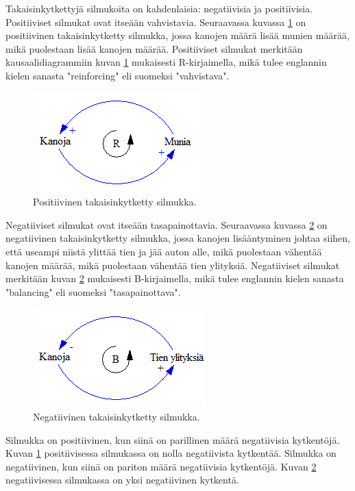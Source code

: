 \documentclass[finnish,12pt,a4paper,pdftex]{article}
\begin{document}
\begin{onehalfspacing}
Takaisinkytkettyjä silmukoita on kahdenlaisia: negatiivisia ja positiivisia. Positiiviset silmukat ovat itseään vahvistavia. Seuraavassa kuvassa \ref{sysdyn:positiivinen} on positiivinen takaisinkytketty silmukka, jossa kanojen määrä lisää munien määrää, mikä puolestaan lisää kanojen määrää. Positiiviset silmukat merkitään kausaalidiagrammiin kuvan \ref{sysdyn:positiivinen} mukaisesti R-kirjaimella, mikä tulee englannin kielen sanasta "reinforcing" eli suomeksi "vahvistava". \cite[s. 12--13]{Sterman2000}\cite{WhatIsSystemDynamics}

\begin{figure}[H]
\centering \includegraphics{positiivinen}
\caption{Positiivinen takaisinkytketty silmukka. \cite[s. 13]{Sterman2000} \label{sysdyn:positiivinen}}
\end{figure}

Negatiiviset silmukat ovat itseään tasapainottavia. Seuraavassa kuvassa \ref{sysdyn:negatiivinen} on negatiivinen takaisinkytketty silmukka, jossa kanojen lisääntyminen johtaa siihen, että useampi niistä ylittää tien ja jää auton alle, mikä puolestaan vähentää kanojen määrää, mikä puolestaan vähentää tien ylityksiä. Negatiiviset silmukat merkitään kuvan \ref{sysdyn:negatiivinen} mukaisesti B-kirjaimella, mikä tulee englannin kielen sanasta "balancing" eli suomeksi "tasapainottava". \cite[s. 12--14]{Sterman2000}

\begin{figure}[H]
\centering \includegraphics{negatiivinen}
\caption{Negatiivinen takaisinkytketty silmukka. \cite[s. 13]{Sterman2000} \label{sysdyn:negatiivinen}}
\end{figure}

Silmukka on positiivinen, kun siinä on parillinen määrä negatiivisia kytkentöjä. Kuvan \ref{sysdyn:positiivinen} positiivisessa silmukassa on nolla negatiivista kytkentää. Silmukka on negatiivinen, kun siinä on pariton määrä negatiivisia kytkentöjä. Kuvan \ref{sysdyn:negatiivinen} negatiivisessa silmukassa on yksi negatiivinen kytkentä. \cite[s. 12--14]{Sterman2000}


\end{onehalfspacing}
\end{document}
